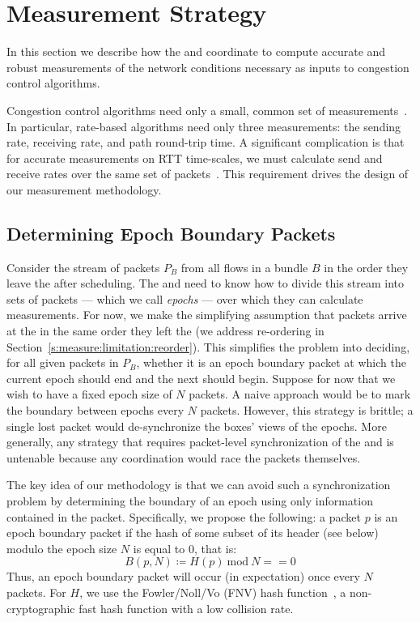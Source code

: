 \section{Measurement Strategy}\label{s:measurement}

In this section we describe how the \inbox and \outbox coordinate to compute accurate and robust
measurements of the network conditions necessary as inputs to congestion control algorithms.

Congestion control algorithms need only a small, common set of measurements~\cite{ccp-hotnets}. 
In particular, rate-based algorithms need only three measurements: 
the sending rate, receiving rate, and path round-trip time.
A significant complication is that for accurate measurements on RTT time-scales, we must calculate send and receive rates over the same set of packets~\cite{packettrain}.
This requirement drives the design of our measurement methodology.

\subsection{Determining Epoch Boundary Packets}
\label{s:measure:marking}
Consider the stream of packets $P_B$ from all flows in a bundle $B$ in the order they leave the \inbox after scheduling.
The \inbox and \outbox need to know how to divide this stream into sets 
of packets --- which we call \emph{epochs} --- over which they can calculate measurements.
For now, we make the simplifying assumption that packets arrive at the \outbox in the same order they 
left the \inbox (we address re-ordering in Section~\ref{s:measure:limitation:reorder}). 
This simplifies the problem into deciding, for all given packets in $P_B$, whether it is an epoch boundary packet at which the current epoch should end and the next should begin. 
Suppose for now that we wish to have a fixed epoch size of $N$ packets.
A naive approach would be to mark the boundary between epochs every $N$ packets. 
However, this strategy is brittle; a single lost packet would de-synchronize the boxes' views of the epochs. 
More generally, any strategy that requires packet-level synchronization of the \inbox and
\outbox is untenable because any coordination would race the packets themselves.

The key idea of our methodology is that we can avoid such a synchronization problem by determining the boundary of an epoch using only information contained in the packet.
Specifically, we propose the following: a packet $p$ is an epoch boundary packet if the hash 
of some subset of its header (see below) modulo the epoch size $N$ is equal to 0, that is:
$$B(p,N) \coloneqq H(p)\ \text{mod}\ N == 0$$
Thus, an epoch boundary packet will occur (in expectation) once every $N$ packets.
For $H$, we use the Fowler/Noll/Vo (FNV) hash function~\cite{fnv-hash}, a non-cryptographic fast hash function with a low collision rate. 

